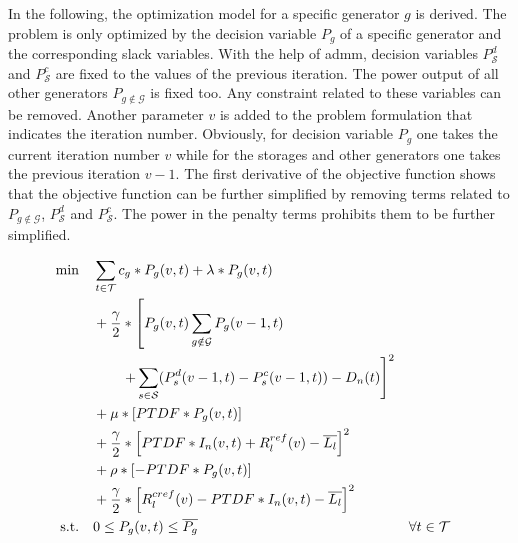 In the following, the optimization model for a specific generator $g$ is derived. The problem is only optimized by the decision variable $P_{g}$ of a specific generator and the corresponding slack variables. With the help of \gls{admm}, decision variables $P_{\mathcal{S}}^d$ and $P_{\mathcal{S}}^c$ are fixed to the values of the previous iteration. The power output of all other generators $P_{g \notin \mathcal{G}}$ is fixed too. Any constraint related to these variables can be removed. Another parameter $v$ is added to the problem formulation that indicates the iteration number. Obviously, for decision variable $P_{g}$ one takes the current iteration number $v$ while for the storages and other generators one takes the previous iteration $v-1$. The first derivative of the objective function shows that the objective function can be further simplified by removing terms related to $P_{g \notin \mathcal{G}}$, $P_{\mathcal{S}}^d$ and $P_{\mathcal{S}}^c$. The power in the penalty terms prohibits them to be further simplified.

\begin{subequations}
	\begin{align}
		 \min \quad & \sum_{t\in\mathcal{T}} c_g*P_g(v, t) + \lambda * P_g(v, t) \\
		 & + \frac{\gamma}{2} * \left[ P_g(v, t) \sum_{g\notin\mathcal{G}}P_g(v-1,t) \right. \nonumber \\
		 & \qquad \left. + \sum_{s\in\mathcal{S}}(P_s^d(v-1, t)-P_s^c(v-1, t))-D_n(t)\right]^2 \\
		 & + \mu * \left[PTDF * P_g(v, t)\right] \nonumber \\
		 & + \frac{\gamma}{2} * \left[PTDF * I_n(v, t) + R^{ref}_l(v) - \overline{L_l}\right]^2 \nonumber \\
		 & + \rho * \left[- PTDF * P_g(v, t)\right] \nonumber \\
		 & + \frac{\gamma}{2} * \left[R^{cref}_l(v) - PTDF * I_n(v, t) - \overline{L_l}\right]^2\nonumber \\
		 \text{s.t.} \quad & 0 \leq P_g(v, t) \leq \overline{P_g} && \forall t \in \mathcal{T}
	\end{align}
\end{subequations}

